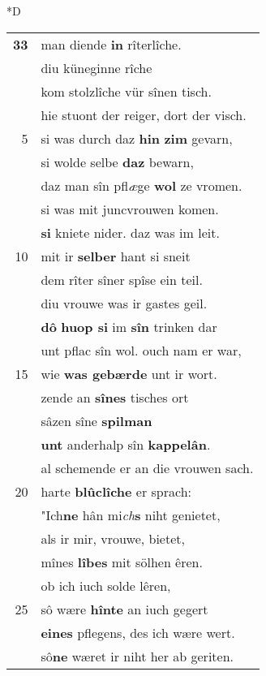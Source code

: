 \documentclass[8pt,a4paper,notitlepage]{article}
\begin{document}
\begin{table}[ht]
\begin{minipage}[t]{0.5\linewidth}
\small
\begin{center}*D
\end{center}
\begin{tabular}{rl}
\textbf{33} & man diende \textbf{in} rîterlîche.\\ 
 & diu küneginne rîche\\ 
 & kom stolzlîche vür sînen tisch.\\ 
 & hie stuont der reiger, dort der visch.\\ 
5 & si was durch daz \textbf{hin} \textbf{zim} gevarn,\\ 
 & si wolde selbe \textbf{daz} bewarn,\\ 
 & daz man sîn pfl\textit{æ}ge \textbf{wol} ze vromen.\\ 
 & si was mit juncvrouwen komen.\\ 
 & \textbf{si} kniete nider. daz was im leit.\\ 
10 & mit ir \textbf{selber} hant si sneit\\ 
 & dem rîter sîner spîse ein teil.\\ 
 & diu vrouwe was ir gastes geil.\\ 
 & \textbf{dô} \textbf{huop si} im \textbf{sîn} trinken dar\\ 
 & unt pflac sîn wol. ouch nam er war,\\ 
15 & wie \textbf{was gebærde} unt ir wort.\\ 
 & zende an \textbf{sînes} tisches ort\\ 
 & sâzen sîne \textbf{spilman}\\ 
 & \textbf{unt} anderhalp sîn \textbf{kappelân}.\\ 
 & al schemende er an die vrouwen sach.\\ 
20 & harte \textbf{blûclîche} er sprach:\\ 
 & "Ich\textbf{ne} hân mi\textit{ch}\textbf{s} niht genietet,\\ 
 & als ir mir, vrouwe, bietet,\\ 
 & mînes \textbf{lîbes} mit sölhen êren.\\ 
 & ob ich iuch solde lêren,\\ 
25 & sô wære \textbf{hînte} an iuch gegert\\ 
 & \textbf{eines} pflegens, des ich wære wert.\\ 
 & sô\textbf{ne} wæret ir niht her ab geriten.\\ 

\end{tabular}
\end{minipage}
\end{table}
\end{document}
